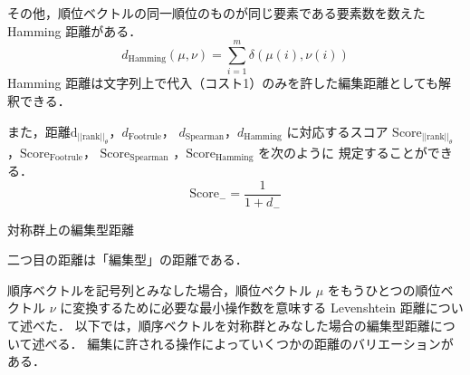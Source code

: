 \documentclass[japanese]{jnlp_1.4}
\renewcommand{\paragraph}{}
\begin{document}
その他，順位ベクトルの同一順位のものが同じ要素である要素数を数えたHamming 距離がある．
\[
d_{\mbox{Hamming}}(\mu,\nu) = \sum^{m}_{i=1} \delta(\mu(i),\nu(i))
\]
Hamming 距離は文字列上で代入（コスト1）のみを許した編集距離としても解釈できる．

また，距離$\mbox{d}_{||\mbox{rank}||_\theta}$，$d_{\mbox{Footrule}}$，
$d_{\mbox{Spearman}}$，$d_{\mbox{Hamming}}$ に対応するスコア
$\mbox{Score}_{||\mbox{rank}||_\theta}$，$\mbox{Score}_{\mbox{Footrule}}$，
$\mbox{Score}_{\mbox{Spearman}}$ ，$\mbox{Score}_{\mbox{Hamming}}$  を次のように
規定することができる．
\[
 \mbox{Score}_{-} = \frac{1}{1+d_{-}}
\]


\paragraph{対称群上の編集型距離}
\label{para:rankedit}

二つ目の距離は「編集型」の距離である．

順序ベクトルを記号列とみなした場合，順位ベクトル $\mu$ をもうひとつの順位ベクトル $\nu$ に変換するために必要な最小操作数を意味する Levenshtein 距離について述べた．
以下では，順序ベクトルを対称群とみなした場合の編集型距離について述べる．
編集に許される操作によっていくつかの距離のバリエーションがある．
\end{document}
